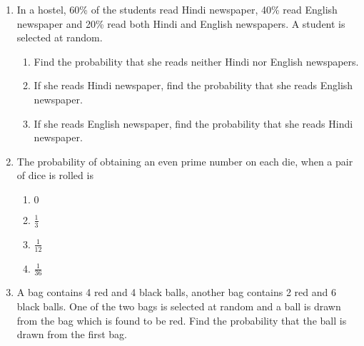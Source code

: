 \begin{enumerate}[label=\thesection.\arabic*,ref=\thesection.\theenumi]
\item In a hostel, 60\% of the students read Hindi newspaper, 40\% read English newspaper and 20\% read both Hindi and English newspapers. A student is selected at random.
		\label{ncert/12/13/2/15}
\begin{enumerate}
\item Find the probability that she reads neither Hindi nor English newspapers.
\item If she reads Hindi newspaper, find the probability that she reads English newspaper.
\item If she reads English newspaper, find the probability that she reads Hindi newspaper.\\
\end{enumerate}
\item The probability of obtaining an even prime number on each die, when a pair of dice is rolled is 
\begin{enumerate}
    \item $0$ 
    
    \item $\frac{1}{3}$ 
    
    \item $\frac{1}{12}$ 
    
    \item $\frac{1}{36}$ 
\end{enumerate}
\solution
		
	\item A bag contains 4 red and 4 black balls, another bag contains 2 red and 6 black balls. One of the two bags is selected at random and a ball is drawn from the bag which is found to be red. Find the probability that the ball is drawn from the first bag.
\\
\solution
		

\end{enumerate}

